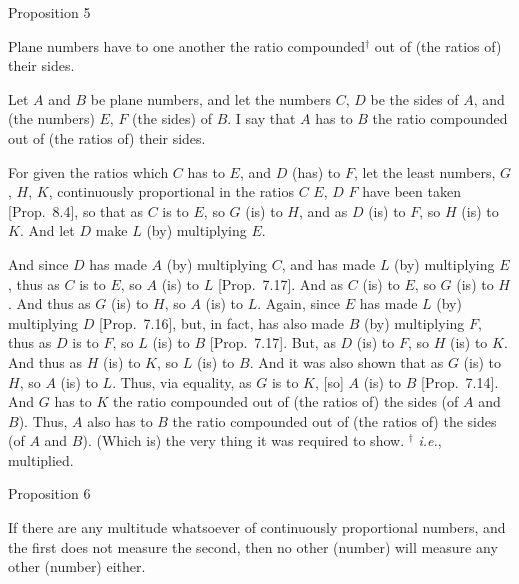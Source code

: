 
\begin{center}
{\large Proposition 5}
\end{center}

Plane numbers have to one another the ratio compoun\-ded$^\dag$ out of (the ratios of)
 their sides.
 
 \epsfysize=2in
\centerline{}

Let $A$ and $B$ be plane numbers, and let the numbers $C$, $D$ be the
sides of $A$, and (the numbers) $E$, $F$ (the sides) of $B$. I say that $A$ has to $B$ the ratio compounded out of (the ratios of)  their sides.

For given the ratios which $C$ has to $E$, and $D$ (has) to $F$, let the least numbers, $G$, $H$, $K$, continuously proportional in the
ratios $C$ $E$, $D$ $F$ have been taken [Prop.~8.4], so that as $C$ is to $E$, so
$G$ (is) to $H$, and as $D$ (is) to $F$, so $H$ (is) to $K$. And let $D$ make $L$ (by) multiplying $E$. 

And since $D$ has made $A$ (by) multiplying $C$, and has made $L$ (by)
multiplying $E$, thus as $C$ is to  $E$, so $A$ (is) to $L$ [Prop.~7.17]. And as $C$ (is) to $E$, so $G$ (is) to
$H$. And thus as $G$ (is) to $H$, so $A$ (is) to $L$. Again, since
$E$ has made $L$ (by) multiplying $D$ [Prop.~7.16],
but, in fact, has also made $B$ (by) multiplying $F$, thus as $D$ is to 
$F$, so $L$ (is) to $B$  [Prop.~7.17]. But,
as $D$ (is) to $F$, so $H$ (is) to $K$.  And thus as $H$ (is) to $K$, so
$L$ (is) to $B$. And it was also shown that as $G$ (is) to $H$, so $A$ (is)
to $L$. Thus, via equality, as $G$ is to $K$, [so] $A$ (is) to $B$ [Prop.~7.14]. 
And $G$ has to $K$ the ratio compounded out of (the ratios
of) the sides (of $A$ and $B$). Thus, $A$ also has to $B$ the ratio
compounded out of (the ratios of) the sides (of $A$ and $B$). (Which is)
the very thing it was required to show.
{\footnotesize\noindent$^\dag$ {\em i.e.}, multiplied.}


\begin{center}
{\large Proposition 6}
\end{center}

If there are any multitude whatsoever of continuously
proportional numbers, and the first does not measure the second, then no other (number) will
 measure any other (number) either.
 
